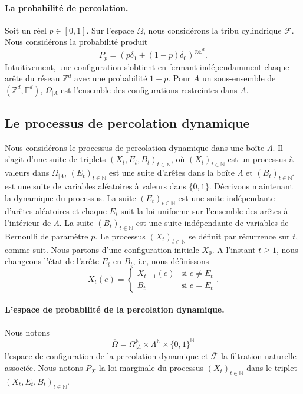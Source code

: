 \documentclass[titlepage,a4paper,12pt]{article}
\newcounter{th}
\begin{document}
\paragraph{La probabilité de percolation.} Soit un réel $p\in [0,1]$. Sur l'espace $\Omega$, nous considérons la tribu cylindrique $\mathcal{F}$. Nous considérons la probabilité produit $$P_p = (p\delta_1 +(1-p)\delta_0)^{\otimes\mathbb{E}^d}.$$ Intuitivement, une configuration s'obtient en fermant indépendamment cha\-que arête du réseau $\mathbb{Z}^d$ avec une probabilité $1-p$. Pour $A$ un sous-ensemble de $(\mathbb{Z}^d,\mathbb{E}^d)$, $\Omega_{|A}$ est l'ensemble des configurations restreintes dans $A$.
\subsection{Le processus de percolation dynamique}
Nous considérons le processus de percolation dynamique dans une boîte $\Lambda$. Il s'agit d'une suite de triplets $(X_t,E_t,B_t)_{t\in \mathbb{N}}$, où $(X_t)_{t\in\mathbb{N}}$ est un processus à valeurs dans $\Omega_{|\Lambda}$, $(E_t)_{t\in\mathbb{N}}$ est une suite d'arêtes dans la boîte $\Lambda$ et $(B_t)_{t\in \mathbb{N}^*}$ est une suite de variables aléatoires à valeurs dans $\{0,1\}$. Décrivons maintenant la dynamique du processus. La suite $(E_t)_{t\in\mathbb{N}}$ est une suite indépendante d'arêtes aléatoires et chaque $E_t$ suit la loi uniforme sur l'ensemble des arêtes à l'intérieur de $\Lambda$. La suite $(B_t)_{t\in\mathbb{N}}$ est une suite indépendante de variables de Bernoulli de paramètre $p$. Le processus $(X_t)_{t\in\mathbb{N}}$ se définit par récurrence sur $t$, comme suit. Nous partons d'une configuration initiale $X_0$. A l'instant $t\geqslant 1$, nous changeons l'état de l'arête $E_t$ en $B_t$, i.e, nous définissons
$$ X_t(e) = \left\lbrace \begin{array}{cc}
X_{t-1}(e) & \text{si }e\neq E_t \\
B_{t} & \text{si } e = E_t
\end{array} \right..
$$ 

\paragraph{L'espace de probabilité de la percolation dynamique.}
Nous notons $$\overline{\Omega} = \Omega_{|\Lambda}^\mathbb{N}\times \Lambda^\mathbb{N}\times\{0,1\}^\mathbb{N}$$ l'espace de configuration de la percolation dynamique et $\overline{\mathcal{F}}$ la filtration naturelle associée. Nous notons $P_X$ la loi marginale du processus $(X_t)_{t\in\mathbb{N}}$ dans le triplet $(X_t,E_t,B_t)_{t\in\mathbb{N}}$.
\end{document}
